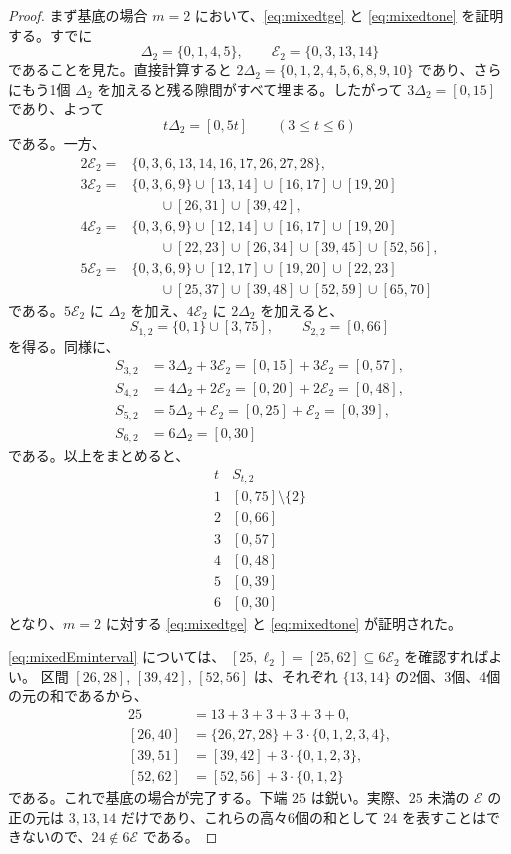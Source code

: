 \documentclass[12pt]{ltjsarticle}
\theoremstyle{plain}
\begin{document}
\begin{proof}
まず基底の場合 $m=2$ において、\eqref{eq:mixedtge} と
\eqref{eq:mixedtone} を証明する。すでに
\[
 \Delta_2=\{0,1,4,5\},\qquad \mathcal E_2=\{0,3,13,14\}
\]
であることを見た。直接計算すると
$2\Delta_2=\{0,1,2,4,5,6,8,9,10\}$ であり、さらにもう1個
$\Delta_2$ を加えると残る隙間がすべて埋まる。したがって
$3\Delta_2=[0,15]$ であり、よって
\[
 t\Delta_2=[0,5t]\qquad(3\leq t\leq6)
\]
である。一方、
\[
\begin{aligned}
2\mathcal E_2
={}&\{0,3,6,13,14,16,17,26,27,28\},\\[1ex]
3\mathcal E_2
={}&\{0,3,6,9\}\cup[13,14]\cup[16,17]\cup[19,20]\\
&\qquad\cup[26,31]\cup[39,42],\\[1ex]
4\mathcal E_2
={}&\{0,3,6,9\}\cup[12,14]\cup[16,17]\cup[19,20]\\
&\qquad\cup[22,23]\cup[26,34]\cup[39,45]\cup[52,56],\\[1ex]
5\mathcal E_2
={}&\{0,3,6,9\}\cup[12,17]\cup[19,20]\cup[22,23]\\
&\qquad\cup[25,37]\cup[39,48]\cup[52,59]\cup[65,70]
\end{aligned}
\]
である。$5\mathcal E_2$ に $\Delta_2$ を加え、$4\mathcal E_2$ に
$2\Delta_2$ を加えると、
\[
 S_{1,2}=\{0,1\}\cup[3,75],\qquad S_{2,2}=[0,66]
\]
を得る。同様に、
\[
\begin{aligned}
S_{3,2}&=3\Delta_2+3\mathcal E_2=[0,15]+3\mathcal E_2=[0,57],\\[1ex]
S_{4,2}&=4\Delta_2+2\mathcal E_2=[0,20]+2\mathcal E_2=[0,48],\\[1ex]
S_{5,2}&=5\Delta_2+\mathcal E_2=[0,25]+\mathcal E_2=[0,39],\\[1ex]
S_{6,2}&=6\Delta_2=[0,30]
\end{aligned}
\]
である。以上をまとめると、
\[
\begin{array}{c|c}
t&S_{t,2}\\ \hline
1&[0,75]\setminus\{2\}\\
2&[0,66]\\
3&[0,57]\\
4&[0,48]\\
5&[0,39]\\
6&[0,30]
\end{array}
\]
となり、$m=2$ に対する \eqref{eq:mixedtge} と
\eqref{eq:mixedtone} が証明された。

\eqref{eq:mixedEminterval} については、
$[25,\ell_2]=[25,62]\subseteq6\mathcal E_2$ を確認すればよい。
区間 $[26,28]$, $[39,42]$, $[52,56]$ は、それぞれ
$\{13,14\}$ の2個、3個、4個の元の和であるから、
\[
\begin{aligned}
25&=13+3+3+3+3+0,\\
[26,40]&=\{26,27,28\}+3\cdot\{0,1,2,3,4\},\\
[39,51]&=[39,42]+3\cdot\{0,1,2,3\},\\
[52,62]&=[52,56]+3\cdot\{0,1,2\}
\end{aligned}
\]
である。これで基底の場合が完了する。下端 $25$ は鋭い。実際、$25$ 未満の
$\mathcal E$ の正の元は $3,13,14$ だけであり、これらの高々6個の和として
$24$ を表すことはできないので、$24\notin6\mathcal E$ である。


\end{proof}
\end{document}

